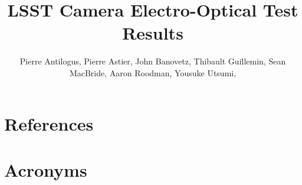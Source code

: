 \documentclass[SE,lsstdraft,authoryear,toc]{lsstdoc}
\title{LSST Camera Electro-Optical Test Results}
\author{%
Pierre Antilogus,
Pierre Astier,
John Banovetz,
Thibault Guillemin,
Sean MacBride,
Aaron Roodman,
Yousuke Utsumi,
}
\date{\vcsDate}
\begin{document}
\maketitle


\appendix
\section{References} \label{sec:bib}
\renewcommand{\refname}{} %


\section{Acronyms} \label{sec:acronyms}

\end{document}
